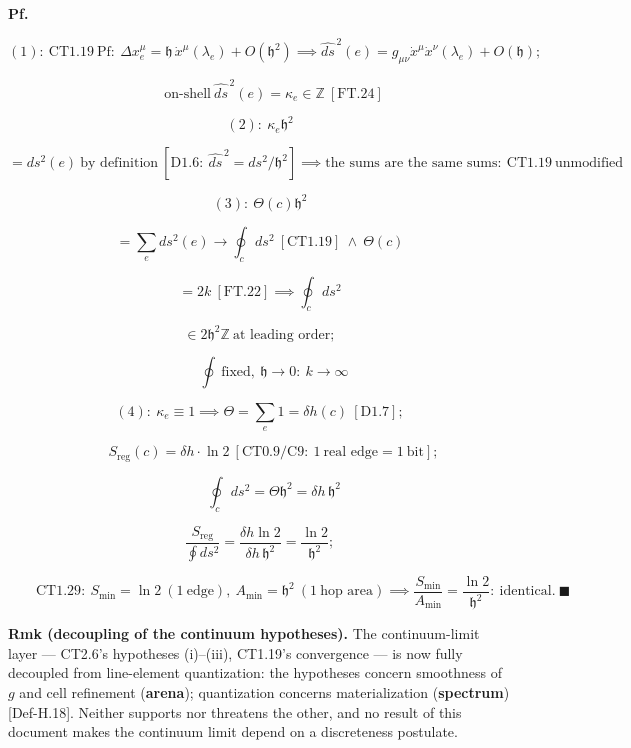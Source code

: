 \begin{theorem}
\textbf{Pf.}

\[
(1):\ \mathrm{CT1.19}\ \text{Pf}:\ \Delta x^\mu_e=\mathfrak h\,\dot x^\mu(\lambda_e)+O(\mathfrak h^2)\implies\widehat{ds}^{\,2}(e)=g_{\mu\nu}\dot x^\mu\dot x^\nu(\lambda_e)+O(\mathfrak h);
\]

\[
\qquad \text{on-shell}\ \widehat{ds}^{\,2}(e)=\kappa_e\in\mathbb Z\ [\mathrm{FT.24}]
\]

\[
(2):\ \kappa_e\mathfrak h^2
\]

\[
= ds^2(e)\ \text{by definition}\ [\mathrm{D1.6}:\ \widehat{ds}^{\,2}=ds^2/\mathfrak h^2]\implies\text{the sums are the same sums}:\ \mathrm{CT1.19}\ \text{unmodified}
\]

\[
(3):\ \Theta(c)\mathfrak h^2
\]

\[
= \sum_e ds^2(e)\to\oint_c ds^2\ [\mathrm{CT1.19}]\ \wedge\ \Theta(c)
\]

\[
= 2k\ [\mathrm{FT.22}]\implies\oint_c ds^2
\]

\[
\in 2\mathfrak h^2\mathbb Z\ \text{at leading order};
\]

\[
\qquad \oint\ \text{fixed},\ \mathfrak h\to0:\ k\to\infty
\]

\[
(4):\ \kappa_e\equiv1\implies\Theta=\sum_e1=\delta h(c)\ [\mathrm{D1.7}];
\]

\[
\qquad S_{\mathrm{reg}}(c)=\delta h\cdot\ln2\ [\mathrm{CT0.9}/\mathrm{C9}:\ 1\ \text{real edge}=1\ \text{bit}];
\]

\[
\qquad \oint_c ds^2=\Theta\mathfrak h^2=\delta h\,\mathfrak h^2
\]

\[
\frac{S_{\mathrm{reg}}}{\oint ds^2}=\frac{\delta h\ln2}{\delta h\,\mathfrak h^2}=\frac{\ln2}{\mathfrak h^2};
\]

\[
\qquad \mathrm{CT1.29}:\ S_{\min}=\ln2\ (1\ \text{edge}),\ A_{\min}=\mathfrak h^2\ (1\ \text{hop area})\implies\frac{S_{\min}}{A_{\min}}=\frac{\ln2}{\mathfrak h^2}:\ \text{identical}.\ \blacksquare
\]

\textbf{Rmk (decoupling of the continuum hypotheses).} The continuum-limit layer — CT2.6's hypotheses (i)–(iii), CT1.19's convergence — is now fully decoupled from line-element quantization: the hypotheses concern smoothness of $g$ and cell refinement (\textbf{arena}); quantization concerns materialization (\textbf{spectrum}) [Def-H.18]. Neither supports nor threatens the other, and no result of this document makes the continuum limit depend on a discreteness postulate.


\end{theorem}
